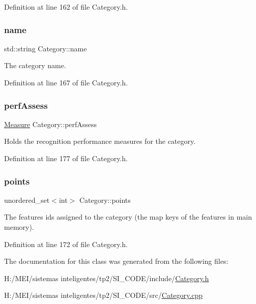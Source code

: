 Definition at line 162 of file Category.\+h.

\mbox{\label{class_category_a433491cdb802174ee504a41eea7bc7c7}} 
\subsubsection{\texorpdfstring{name}{name}}
{\footnotesize\ttfamily std\+::string Category\+::name\hspace{0.3cm}{\ttfamily [protected]}}

The category name. 

Definition at line 167 of file Category.\+h.

\mbox{\label{class_category_ae2153cae8cf1b7eded7625a40e45ab8c}} 
\subsubsection{\texorpdfstring{perf\+Assess}{perfAssess}}
{\footnotesize\ttfamily \hyperlink{class_measure}{Measure} Category\+::perf\+Assess\hspace{0.3cm}{\ttfamily [protected]}}

Holds the recognition performance measures for the category. 

Definition at line 177 of file Category.\+h.

\mbox{\label{class_category_a9b83a3525cbe3c9e806ca10f7c39f51f}} 
\subsubsection{\texorpdfstring{points}{points}}
{\footnotesize\ttfamily unordered\+\_\+set$<$int$>$ Category\+::points\hspace{0.3cm}{\ttfamily [protected]}}

The features\textquotesingle{} ids assigned to the category (the map keys of the features in main memory). 

Definition at line 172 of file Category.\+h.



The documentation for this class was generated from the following files\+:\begin{DoxyCompactItemize}
\item 
H\+:/\+M\+E\+I/sistemas inteligentes/tp2/\+S\+I\+\_\+\+C\+O\+D\+E/include/\hyperlink{_category_8h}{Category.\+h}\item 
H\+:/\+M\+E\+I/sistemas inteligentes/tp2/\+S\+I\+\_\+\+C\+O\+D\+E/src/\hyperlink{_category_8cpp}{Category.\+cpp}\end{DoxyCompactItemize}
